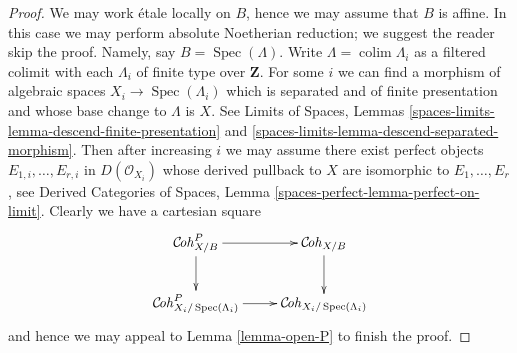 \documentclass[10pt,a4paper]{amsart}
\theoremstyle{plain}
\theoremstyle{definition}
\theoremstyle{remark}
\numberwithin{equation}{subsection}
\def\colim{\mathop{\mathrm{colim}}\nolimits}
\def\Spec{\mathop{\mathrm{Spec}}}
\def\Cohstack{\mathcal{C}\!\mathit{oh}}
\begin{document}
\begin{proof}
We may work \'etale locally on $B$, hence we may assume that $B$ is affine.
In this case we may perform absolute Noetherian reduction; we suggest
the reader skip the proof. Namely, say $B = \Spec(\Lambda)$.
Write $\Lambda = \colim \Lambda_i$ as a filtered colimit with each $\Lambda_i$
of finite type over $\mathbf{Z}$. For some $i$ we can find
a morphism of algebraic spaces $X_i \to \Spec(\Lambda_i)$
which is separated and of finite presentation and whose base change
to $\Lambda$ is $X$. See Limits of Spaces, Lemmas
\ref{spaces-limits-lemma-descend-finite-presentation} and
\ref{spaces-limits-lemma-descend-separated-morphism}.
Then after increasing $i$ we may assume there exist
perfect objects $E_{1, i}, \ldots, E_{r, i}$
in $D(\mathcal{O}_{X_i})$ whose derived pullback to $X$
are isomorphic to $E_1, \ldots, E_r$, see
Derived Categories of Spaces, Lemma
\ref{spaces-perfect-lemma-perfect-on-limit}.
Clearly we have a cartesian square
$$
\xymatrix{
\Cohstack^P_{X/B} \ar[r] \ar[d] &
\Cohstack_{X/B} \ar[d] \\
\Cohstack^P_{X_i/\Spec(\Lambda_i)} \ar[r] &
\Cohstack_{X_i/\Spec(\Lambda_i)}
}
$$
and hence we may appeal to Lemma \ref{lemma-open-P}
to finish the proof.
\end{proof}
\end{document}
